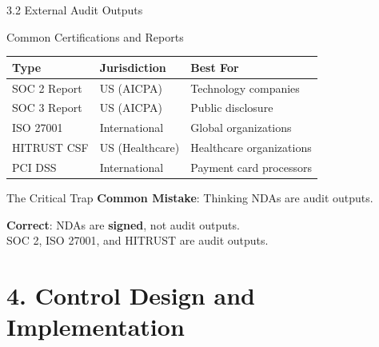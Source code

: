 \documentclass{beamer}
\begin{document}
	\begin{frame}{3.2 External Audit Outputs}
		\begin{block}{Common Certifications and Reports}
			\begin{tabular}{|p{3cm}|p{4cm}|p{4cm}|}
				\hline
				\textbf{Type} & \textbf{Jurisdiction} & \textbf{Best For} \\
				\hline
				SOC 2 Report & US (AICPA) & Technology companies \\
				\hline
				SOC 3 Report & US (AICPA) & Public disclosure \\
				\hline
				ISO 27001 & International & Global organizations \\
				\hline
				HITRUST CSF & US (Healthcare) & Healthcare organizations \\
				\hline
				PCI DSS & International & Payment card processors \\
				\hline
			\end{tabular}
		\end{block}
		
		\begin{alertblock}{The Critical Trap}
			\textbf{Common Mistake}: Thinking NDAs are audit outputs.
			
			\textbf{Correct}: NDAs are \textbf{signed}, not audit outputs. \\
			SOC 2, ISO 27001, and HITRUST are audit outputs.
		\end{alertblock}
	\end{frame}
	
	\section{4. Control Design and Implementation}
	
\end{document}

